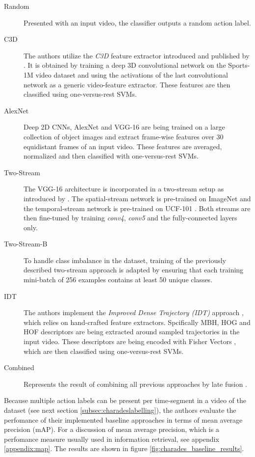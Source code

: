\begin{description}
    \item[Random] Presented with an input video, the classifier outputs a random action label.
    \item[C3D] The authors utilize the \textit{C3D} feature extractor introduced and published by \textcite{tran_learning_2015}. It is obtained by training a deep 3D convolutional network on the Sports-1M video dataset \cite{karpathy_large-scale_2014} and using the activations of the last convolutional network as a generic video-feature extractor. These features are then classified using one-versus-rest SVMs.
    \item[AlexNet] Deep 2D CNNs, AlexNet \cite{krizhevsky_imagenet_2012-1} and VGG-16 \cite{simonyan_very_2014} are being trained on a large collection of object images and extract frame-wise features over 30 equidistant frames of an input video. These features are averaged, normalized and then classified with one-versus-rest SVMs.
    \item[Two-Stream] The VGG-16 architecture is incorporated in a two-stream setup as introduced by \textcite{simonyan_two-stream_2014}. The spatial-stream network is pre-trained on ImageNet \cite{deng_imagenet:_2009} and the temporal-stream network is pre-trained on UCF-101 \cite{soomro_ucf101:_2012}. Both streams are then fine-tuned by training \textit{conv4}, \textit{conv5} and the fully-connected layers only.
    \item[Two-Stream-B] To handle class imbalance in the dataset, training of the previously described two-stream approach is adapted by ensuring that each training mini-batch of 256 examples contains at least 50 unique classes.
    \item[IDT] The authors implement the \textit{Improved Dense Trajectory (IDT)} approach \cite{wang_action_2013}, which relies on hand-crafted feature extractors. Spcifically MBH, HOG and HOF descriptors are being extracted around sampled trajectories in the input video. These descriptors are being encoded with Fisher Vectors \cite{perronnin_improving_2010}, which are then classified using one-versus-rest SVMs.
    \item[Combined] Represents the result of combining all previous approaches by late fusion \cite{karpathy_large-scale_2014}.
\end{description}

Because multiple action labels can be present per time-segment in a video of the dataset (see next section \ref{subsec:charadeslabelling}), the authors evaluate the perfomance of their implemented baseline approaches in terms of mean average precision (mAP).
For a discussion of mean average precision, which is a perfomance measure usually used in information retrieval, see appendix \ref{appendix:map}.
The results are shown in figure \ref{fig:charades_baseline_results}.

